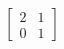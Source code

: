 \documentclass[preview]{standalone}
\begin{document}
\begin{align*}
\begin{bmatrix} 2 & 1 \\ 0 & 1 \end{bmatrix}
\end{align*}
\end{document}
